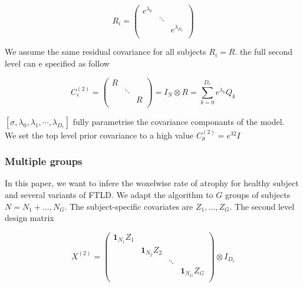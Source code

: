 \documentclass[final, paper=letter,5p,times,twocolumn]{elsarticle}
\theoremstyle{definition}
\begin{document}
\begin{equation}
  R_{i} =
  \left (
  \begin{array}{ccc}
    e^{\lambda_{0}} && \\
    & \ddots & \\
    && e^{\lambda_{D_{r}}}\\
  \end{array}
    \right )
  \label{Residual_covariance}
\end{equation}

We assume the same residual covariance for all subjects $R_{i} = R$. the full second level can e specified as follow

\begin{equation}
  C_{\epsilon}^{(2)} =
  \left (
  \begin{array}{ccc}
    R && \\
    & \ddots & \\
    && R\\
  \end{array}
    \right ) = I_{N} \otimes R = \sum_{k = 0}^{D_{r}} e^{\lambda_{k}} Q_{k}
  \label{Residual_second_level}
\end{equation}

$[\sigma, \lambda_{0}, \lambda_{1}, \cdots, \lambda_{D_{r}}]$ fully parametrise the covariance componants of the model. \\
We set the top level prior covariance to a high value $C_{\theta}^{(2)} = e^{32}I$

\subsubsection{Multiple groups}

In this paper, we want to infere the woxelwise rate of atrophy for healthy subject and several variants of FTLD. We adapt the algorithm to $G$ groups of subjects $N = N_{1} + \dots, N_{G}$. The subject-specific covariates are $Z_{1}, \dots, Z_{G}$. The second level design matrix

\begin{equation*}
  X^{(2)} =
  \left (
  \begin{array}{cccc}
    {\bm 1}_{N_{1}}Z_{1} &&& \\
    &{\bm 1}_{N_{2}}Z_{2} && \\
    &&\ddots&\\
    &&& {\bm 1}_{N_{G}}Z_{G} \\
  \end{array}
    \right ) \otimes I_{D_{r}}
\end{equation*}
\end{document}
